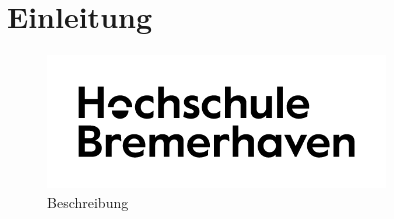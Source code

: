 \section{Einleitung}\label{einleitung}
\Blindtext
\begin{figure}[!ht]
 \centering
 \includegraphics[width=0.8\textwidth]{src/abbildungen/logoneu.png}
 \caption[Beschreibung]{Beschreibung~\cite[S.14]{mf2005}}
\label{fig:Beschreibung}
\end{figure}
\Blindtext

